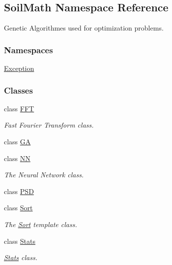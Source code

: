 \hypertarget{namespace_soil_math}{}\subsection{Soil\+Math Namespace Reference}
\label{namespace_soil_math}


Genetic Algorithmes used for optimization problems.  


\subsubsection*{Namespaces}
\begin{DoxyCompactItemize}
\item 
 \hyperlink{namespace_soil_math_1_1_exception}{Exception}
\end{DoxyCompactItemize}
\subsubsection*{Classes}
\begin{DoxyCompactItemize}
\item 
class \hyperlink{class_soil_math_1_1_f_f_t}{F\+F\+T}
\begin{DoxyCompactList}\small\item\em Fast Fourier Transform class. \end{DoxyCompactList}\item 
class \hyperlink{class_soil_math_1_1_g_a}{G\+A}
\item 
class \hyperlink{class_soil_math_1_1_n_n}{N\+N}
\begin{DoxyCompactList}\small\item\em The Neural Network class. \end{DoxyCompactList}\item 
class \hyperlink{class_soil_math_1_1_p_s_d}{P\+S\+D}
\item 
class \hyperlink{class_soil_math_1_1_sort}{Sort}
\begin{DoxyCompactList}\small\item\em The \hyperlink{class_soil_math_1_1_sort}{Sort} template class. \end{DoxyCompactList}\item 
class \hyperlink{class_soil_math_1_1_stats}{Stats}
\begin{DoxyCompactList}\small\item\em \hyperlink{class_soil_math_1_1_stats}{Stats} class. \end{DoxyCompactList}\end{DoxyCompactItemize}
